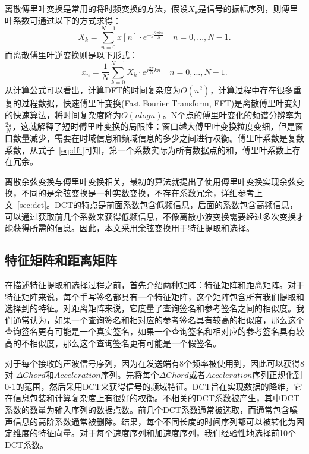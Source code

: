 离散傅里叶变换是常用的将时频变换的方法，假设$X_{k}$是信号的振幅序列，则傅里叶系数可通过以下的方式求得：
\begin{equation}
X_{k} = \sum_{n=0}^{N-1}x[n] \cdot e^{-j\frac{2\pi kn}{N}} \quad n=0,...,N-1.  \label{eq:dft}
\end{equation}
而离散傅里叶逆变换则是以下形式：
\begin{equation}
 x_{n} = \frac{1}{N}\sum_{k=0}^{N-1}X_{k} \cdot e^{j\frac{2\pi}{N}kn} \quad n=0,...,N-1. \label{eq:idft}
\end{equation}
从计算公式可以看出，计算DFT的时间复杂度为$O(n^{2})$，计算过程中存在很多重复的过程数据，快速傅里叶变换(Fast Fourier Transform, FFT)是离散傅里叶变幻的快速算法，将时间复杂度降为$O(nlog n)$。N个点的傅里叶变化的频谱分辨率为$\frac{2\pi}{N}$，这就解释了短时傅里叶变换的局限性：窗口越大傅里叶变换粒度变细，但是窗口数量减少，需要在时域信息和频域信息的多少之间进行权衡。傅里叶系数是复数系数，从式子~\ref{eq:dft}可知，第一个系数实际为所有数据点的和，傅里叶系数上存在冗余。

离散余弦变换与傅里叶变换相关，最初的算法就提出了使用傅里叶变换实现余弦变换，不同的是余弦变换是一种实数变换，不存在系数冗余，详细参考上文~\ref{sec:dct}。DCT的特点是前面系数包含低频信息，后面的系数包含高频信息，可以通过获取前几个系数来获得低频信息，不像离散小波变换需要经过多次变换才能获得所需的信息。因此，本文采用余弦变换用于特征提取和选择。

\subsection{特征矩阵和距离矩阵}  \label{sec:feature-distance-matrix}
在描述特征提取和选择过程之前，首先介绍两种矩阵：特征矩阵和距离矩阵。对于特征矩阵来说，每个手写签名都具有一个特征矩阵，这个矩阵包含所有我们提取和选择到的特征。对距离矩阵来说，它度量了查询签名和参考签名之间的相似度。我们通常认为，如果一个查询签名和相对应的参考签名具有较高的相似度，那么这个查询签名更有可能是一个真实签名，如果一个查询签名和相对应的参考签名具有较高的不相似度，那么这个查询签名更有可能是一个假签名。

对于每个接收的声波信号序列，因为在发送端有8个频率被使用到，因此可以获得8对 $\Delta Chord$和$Acceleration$序列。先将每个$\Delta Chord$或者$Acceleration$序列正规化到0-1的范围，然后采用DCT来获得信号的频域特征。DCT旨在实现数据的降维，它在信息包装和计算复杂度上有很好的权衡。不相关的DCT系数被产生，其中DCT系数的数量为输入序列的数据点数。前几个DCT系数通常被选取，而通常包含噪声信息的高阶系数通常被删除。结果，每个不同长度的时间序列都可以被转化为固定维度的特征向量。对于每个速度序列和加速度序列，我们经验性地选择前10个DCT系数。

